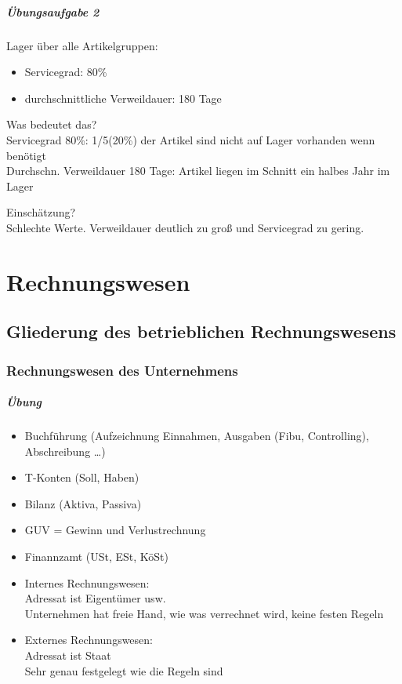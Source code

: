 \paragraph{Übungsaufgabe 2} Lager über alle Artikelgruppen:
\begin{itemize}
\item Servicegrad: 80\%
\item durchschnittliche Verweildauer: 180 Tage
\end{itemize}
\begin{anumerate}
\item Was bedeutet das?\\
Servicegrad 80\%: 1/5(20\%) der Artikel sind nicht auf Lager vorhanden wenn benötigt\\
Durchschn. Verweildauer 180 Tage: Artikel liegen im Schnitt ein halbes Jahr im Lager
\item Einschätzung?\\
Schlechte Werte. Verweildauer deutlich zu groß und Servicegrad zu gering.
\end{anumerate}

\chapter{Rechnungswesen}
\section{Gliederung des betrieblichen Rechnungswesens}
\subsection{Rechnungswesen des Unternehmens}
\paragraph{Übung}
\begin{itemize}
\item Buchführung (Aufzeichnung Einnahmen, Ausgaben (Fibu, Controlling), Abschreibung …)
\item T-Konten (Soll, Haben)
\item Bilanz (Aktiva, Passiva)
\item GUV = Gewinn und Verlustrechnung
\item Finannzamt (USt, ESt, KöSt)
\end{itemize}
\begin{itemize}
\item Internes Rechnungswesen: \\
Adressat ist Eigentümer usw.\\
Unternehmen hat freie Hand, wie was verrechnet wird, keine festen Regeln
\item Externes Rechnungswesen: \\
Adressat ist Staat\\
Sehr genau festgelegt wie die Regeln sind 
\end{itemize}
